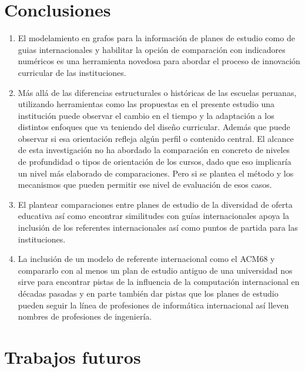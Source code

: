 \clearpage

\section{Conclusiones}

\begin{enumerate}
	\item El modelamiento en grafos para la información de planes de estudio como de guias internacionales y habilitar la opción de comparación con indicadores numéricos es una herramienta novedosa para abordar el proceso de innovación curricular de las instituciones. 
	\item Más allá de las diferencias estructurales o históricas de las escuelas peruanas, utilizando herramientas como las propuestas en el presente estudio una institución puede observar el cambio en el tiempo y la adaptación a los distintos enfoques que va teniendo del diseño curricular. Además que puede observar si esa orientación refleja algún perfil o contenido central. El alcance de esta investigación no ha abordado la comparación en concreto de niveles de profundidad o tipos de orientación de los cursos, dado que eso implicaría un nivel más elaborado de comparaciones. Pero si se plantea el método y los mecanismos que pueden permitir ese nivel de evaluación de esos casos.
	\item El plantear comparaciones entre planes de estudio de la diversidad de oferta educativa así como encontrar similitudes con guías internacionales apoya la inclusión de los referentes internacionales así como puntos de partida para las instituciones.
	\item La inclusión de un modelo de referente internacional como el ACM68 y compararlo con al menos un plan de estudio antiguo de una universidad nos sirve para encontrar pistas de la influencia de la computación internacional en décadas pasadas y en parte también dar pistas que los planes de estudio pueden seguir la línea de profesiones de informática internacional así lleven nombres de profesiones de ingeniería.

\end{enumerate}

\newpage

\section{Trabajos futuros}

